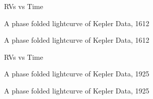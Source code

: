 \documentclass{emulateapj}
\begin{document}


\begin{figure}
\caption{RVs vs Time}
\label{fig:koi1612_rvt}
\end{figure}

\begin{figure}
\label{fig:koi1612_ao}
\end{figure}


\begin{figure}  %
\caption{A phase folded lightcurve of Kepler Data, 1612}
\label{fig:koi1612_lc}
\end{figure}

\begin{figure}  %
\caption{A phase folded lightcurve of Kepler Data, 1612}
\label{fig:koi1612_phrv}
\end{figure}




\begin{figure}
\caption{RVs vs Time}
\label{fig:koi1925_rvt}
\end{figure}


\begin{figure}  %
\caption{A phase folded lightcurve of Kepler Data, 1925}
\label{fig:koi1925_lc}
\end{figure}
 
 
\begin{figure}  %
\caption{A phase folded lightcurve of Kepler Data, 1925}
\label{fig:koi1925_phrv}
\end{figure}
 
\end{document}
